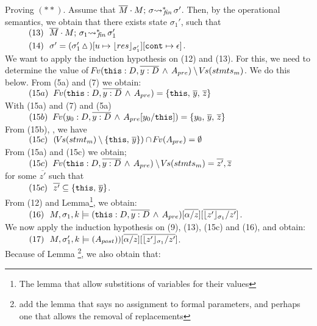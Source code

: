 \begin{description}
 \vspace{.1cm}
Proving $(**)$. Assume that   $\leadstoBoundedStarFin  {\Mtwo\cdot M}  {\sigma}  {\sigma'}$. Then, by the operational semantics, we obtain that 
there exists state $\sigma_1'$, such that \\
$\SPS (13) \ \ \leadstoBoundedStarFin  {\Mtwo\cdot M}  {\sigma_1}  {\sigma_1'}$ \\
$\SPS (14) \ \ \sigma'=(\sigma_1'\popSymbol)[u \mapsto {\interpret {\sigma_1'} {res}}][\prg{cont}\mapsto \epsilon]$.
\\
We want to apply the induction hypothesis on (12) and (13). For this, we need to determine the value of  $\fv(\prg{this}:D,\overline{y:D}\, \wedge\, A_{pre})  \setminus \vs(stmts_m)$.  We do this below. From (5a) and (7) we obtain:\\
$\SPS (15a) \ \ \fv(\prg{this}:D,\overline{y:D}\, \wedge\, A_{pre}) =  \{ \prg{this},\, \overline{y},\, \overline z \} $\\
With    (15a) and (7) and (5a) \\
$\SPS (15b) \ \  \fv(y_0:D,\overline{y:D}\, \wedge\, A_{pre}[y_0/\prg{this}]) =  \{ y_0,\, \overline{y},\,  \overline z \} $
\\
From (15b), {}, we have \\
$\SPS (15c) \ \  (\vs(stmt_m) \setminus \{ \prg{this},\, \overline y \})\cap \fv(A_{pre}) =  \emptyset$
\\
From (15a) and (15c) we obtain;\\
$\SPS (15c) \ \  \fv(\prg{this}:D,\overline{y:D}\, \wedge\, A_{pre})  \setminus \vs(stmts_m) =  \overline {z'}, \overline {z}$
\\
for some $\overline {z'}$ such that
\\
$\SPS (15c)  \ \ \overline {z'} \subseteq  \{ \prg{this},\, \overline{y} \}$.
\\
From (12) and Lemma\footnote{The lemma that allow substitions of variables for their values}, we obtain:
\\
$\SPS (16) \ \  \satDAssertFrom M  {\sigma_1} {k}   {(\prg{this}:D,\overline{y:D}\, \wedge\, A_{pre})[\overline{\alpha/z}][\overline{\interpret {\sigma_1} {z'} /z'}]}$.
\\
We now apply the induction hypothesis on (9), (13), (15c) and (16), and obtain:
\\ 
$\SPS (17) \ \  \satDAssertFrom M  {\sigma_1'} {k}   {(A_{post}))[\overline{\alpha/z}][\overline{\interpret {\sigma_1} {z'} /z'}]}$.
\\
Because of Lemma \footnote{add the lemma that says no assignment to formal parameters, and perhaps one that allows the removal of replacements}, we also obtain that:

\end{description}
